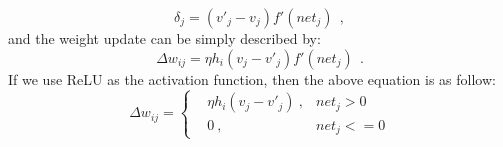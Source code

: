 \begin{equation}
\delta_j = (v'_{j}-v_{j}) f'(net_j)~~,
\end{equation}
and the weight update can be simply described by:
\begin{equation}
\Delta w_{ij} = \eta h_i (v_{j}-v'_{j})  f'(net_j)~~.
\end{equation}
If we use ReLU as the activation function, then the above equation is as follow:
\begin{equation}
\label{equ:ae_widrow_hoff}
\Delta w_{ij} = \left \{
\begin{aligned}
& \eta h_i(v_j - v'_j)~, & net_j > 0 \\
& 0~, & net_j < = 0
\end{aligned} 
\right.
\end{equation}



